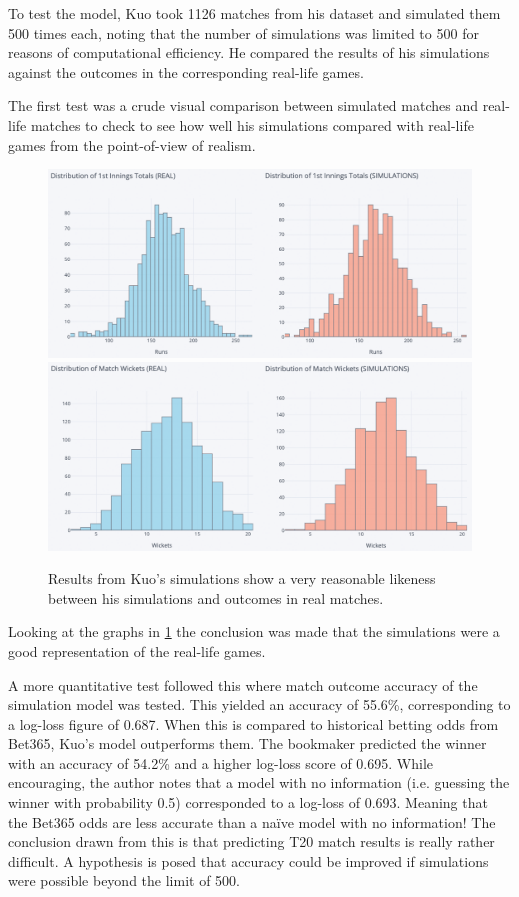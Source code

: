 To test the model, Kuo took 1126 matches from his dataset and simulated them 500 times each, noting that the number of simulations was limited to 500 for reasons of computational efficiency. He compared the results of his simulations against the outcomes in the corresponding real-life games.

The first test was a crude visual comparison between simulated matches and real-life matches to check to see how well his simulations compared with real-life games from the point-of-view of realism.

\begin{figure}[hb]
    \centering
    \includegraphics[width=0.7\columnwidth]{images/kuo2.png}
    \includegraphics[width=0.7\columnwidth]{images/kuo3.png}
    \caption{Results from Kuo's simulations show a very reasonable likeness between his simulations and outcomes in real matches.}
    \label{fig:kuo2}
\end{figure}

Looking at the graphs in \cref{fig:kuo2} the conclusion was made that the simulations were a good representation of the real-life games.

A more quantitative test followed this where match outcome accuracy of the simulation model was tested. This yielded an accuracy of 55.6\%, corresponding to a log-loss figure of 0.687. When this is compared to historical betting odds from Bet365, Kuo’s model outperforms them. The bookmaker predicted the winner with an accuracy of 54.2\% and a higher log-loss score of 0.695. While encouraging, the author notes that a model with no information (i.e. guessing the winner with probability 0.5) corresponded to a log-loss of 0.693. Meaning that the Bet365 odds are less accurate than a naïve model with no information! The conclusion drawn from this is that predicting T20 match results is really rather difficult. A hypothesis is posed that accuracy could be improved if simulations were possible beyond the limit of 500.

